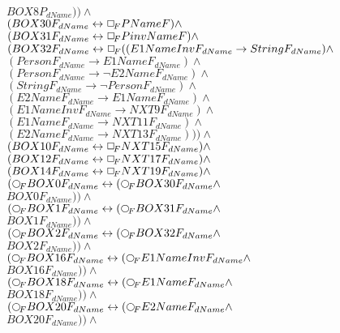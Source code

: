 \documentclass[a4paper,10pt]{article}
\begin{document}
 $ BOX8P_{dName})) \land $ \\ 
 $ (BOX30F_{dName} \leftrightarrow  \Box_{\!F} PNameF) \land $ \\ 
 $ (BOX31F_{dName} \leftrightarrow  \Box_{\!F} PinvNameF) \land $ \\ 
 $ (BOX32F_{dName} \leftrightarrow  \Box_{\!F} ((E1NameInvF_{dName} \rightarrow StringF_{dName}) \land $ \\ 
 $ (PersonF_{dName} \rightarrow E1NameF_{dName}) \land $ \\ 
 $ (PersonF_{dName} \rightarrow  \lnot E2NameF_{dName}) \land $ \\ 
 $ (StringF_{dName} \rightarrow  \lnot PersonF_{dName}) \land $ \\ 
 $ (E2NameF_{dName} \rightarrow E1NameF_{dName}) \land $ \\ 
 $ (E1NameInvF_{dName} \rightarrow NXT9F_{dName}) \land $ \\ 
 $ (E1NameF_{dName} \rightarrow NXT11F_{dName}) \land $ \\ 
 $ (E2NameF_{dName} \rightarrow NXT13F_{dName}))) \land $ \\ 
 $ (BOX10F_{dName} \leftrightarrow  \Box_{\!F} NXT15F_{dName}) \land $ \\ 
 $ (BOX12F_{dName} \leftrightarrow  \Box_{\!F} NXT17F_{dName}) \land $ \\ 
 $ (BOX14F_{dName} \leftrightarrow  \Box_{\!F} NXT19F_{dName}) \land $ \\ 
 $ ( \Rnext BOX0F_{dName} \leftrightarrow ( \Rnext BOX30F_{dName} \land $ \\ 
 $ BOX0F_{dName})) \land $ \\ 
 $ ( \Rnext BOX1F_{dName} \leftrightarrow ( \Rnext BOX31F_{dName} \land $ \\ 
 $ BOX1F_{dName})) \land $ \\ 
 $ ( \Rnext BOX2F_{dName} \leftrightarrow ( \Rnext BOX32F_{dName} \land $ \\ 
 $ BOX2F_{dName})) \land $ \\ 
 $ ( \Rnext BOX16F_{dName} \leftrightarrow ( \Rnext E1NameInvF_{dName} \land $ \\ 
 $ BOX16F_{dName})) \land $ \\ 
 $ ( \Rnext BOX18F_{dName} \leftrightarrow ( \Rnext E1NameF_{dName} \land $ \\ 
 $ BOX18F_{dName})) \land $ \\ 
 $ ( \Rnext BOX20F_{dName} \leftrightarrow ( \Rnext E2NameF_{dName} \land $ \\ 
 $ BOX20F_{dName})) \land $ \\ 
\end{document}
